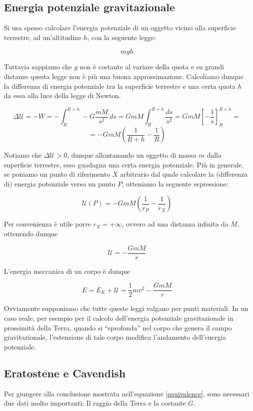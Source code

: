\subsection{Energia potenziale gravitazionale}
Si usa spesso calcolare l'energia potenziale di un oggetto vicino alla superficie
terrestre, ad un'altitudine $h$, con la seguente legge:

\[ mgh \]

\noindent Tuttavia sappiamo che $g$ non è costante al variare della quota e su grandi
distanze questa legge non è più una buona approssimazione. Calcoliamo dunque la differenza
di energia potenziale tra la superficie terrestre e una certa quota $h$ da essa alla luce
della legge di Newton.

\[ \Delta\mathcal{U} = -W = -\int_{R}^{R + h}-G\frac{mM}{s^2}\,ds = GmM\int_{R}^{R+h}\frac{ds}{s^2} = GmM\left[ -\frac{1}{s} \right]_{R}^{R+h} =  \]
\[ = -GmM\left( \frac{1}{R + h} - \frac{1}{R} \right) \]

\noindent Notiamo che $\Delta\mathcal{U} > 0$, dunque allontanando un oggetto di massa
$m$ dalla superficie terrestre, esso guadagna una certa energia potenziale. Più in generale,
se poniamo un punto di riferimento $X$ arbitrario dal quale calcolare la (differenza di)
energia potenziale verso un punto $P$, otteniamo la seguente espressione:

\[ \mathcal{U}(P) = -GmM\left(\frac{1}{r_P} - \frac{1}{r_X}\right) \]

\noindent Per convenienza è utile porre $r_X = +\infty$, ovvero ad una distanza infinita da
$M$, ottenendo dunque

\[ \mathcal{U} = -\frac{GmM}{r} \]

\noindent L'energia meccanica di un corpo è dunque

\[ E = E_K + \mathcal{U} = \frac{1}{2}mv^2 -\frac{GmM}{r} \]

\noindent Ovviamente supponiamo che tutte queste leggi valgano per punti materiali.
In un caso reale, per esempio per il calcolo dell'energia potenziale gravitazionale
in prossimità della Terra, quando si ``sprofonda'' nel corpo che genera il campo
gravitazionale, l'estensione di tale corpo modifica l'andamento dell'energia potenziale.

\subsection{Eratostene e Cavendish}
Per giungere alla conclusione mostrata nell'equazione \ref{equivalence},
sono necessari due dati molto importanti: Il raggio della Terra e la
costante $G$.


